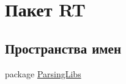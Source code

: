\hypertarget{namespace_r_t}{\section{Пакет R\+T}
\label{namespace_r_t}
}
\subsection*{Пространства имен}
\begin{DoxyCompactItemize}
\item 
package \hyperlink{namespace_r_t_1_1_parsing_libs}{Parsing\+Libs}
\end{DoxyCompactItemize}
